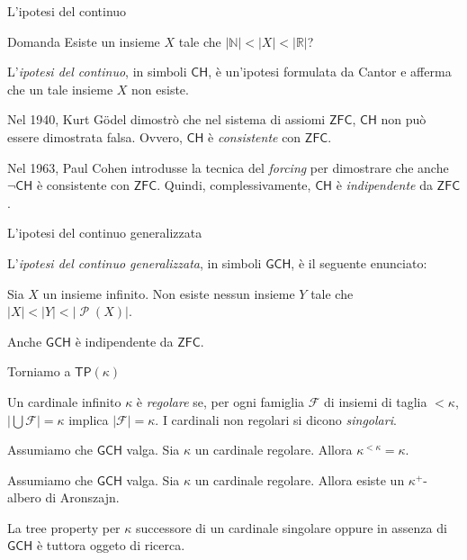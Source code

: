 \documentclass{beamer}
\theoremstyle{num.custom-title}
\theoremstyle{custom-title}
\DeclareMathOperator{\PP}{\mathcal{P}}
\newcommand{\ZFC}{\ensuremath{\mathsf{ZFC}}\xspace}
\newcommand{\TP}{\ensuremath{\mathsf{TP}}\xspace}
\newcommand{\GCH}{\ensuremath{\mathsf{GCH}}\xspace}
\newcommand{\CH}{\ensuremath{\mathsf{CH}}\xspace}
\newcommand{\F}{\mathcal{F}}
\newcommand{\N}{\mathbb{N}}
\newcommand{\R}{\mathbb{R}}
\begin{document}
\begin{frame}{L'ipotesi del continuo}

\begin{exampleblock}{Domanda}
Esiste un insieme $X$ tale che $|\N| < |X| < |\R|$?
\end{exampleblock}

\pause

L'\emph{ipotesi del continuo}, in simboli \CH, è un'ipotesi formulata da Cantor e afferma che un tale insieme $X$ non esiste.

\pause

Nel 1940, Kurt Gödel dimostrò che nel sistema di assiomi \ZFC, \CH non può essere dimostrata falsa. Ovvero, \CH è \emph{consistente} con \ZFC.

\pause

Nel 1963, Paul Cohen introdusse la tecnica del \emph{forcing} per dimostrare che anche $\neg\CH$ è consistente con \ZFC. Quindi, complessivamente, \CH è \emph{indipendente} da \ZFC.

\end{frame}


\begin{frame}{L'ipotesi del continuo generalizzata}

L'\emph{ipotesi del continuo generalizzata}, in simboli \GCH, è il seguente enunciato:
\begin{center}
Sia $X$ un insieme infinito. Non esiste nessun insieme $Y$ tale che $|X| < |Y| < |{\PP(X)}|$.
\end{center}

\pause

Anche \GCH è indipendente da \ZFC.

\end{frame}


\begin{frame}{Torniamo a $\TP(\kappa)$}

\vspace{10pt}

\begin{definition}
Un cardinale infinito $\kappa$ è \emph{regolare} se, per ogni famiglia $\F$ di insiemi di taglia $<\kappa$, $|\bigcup \F| = \kappa$ implica $|\F| = \kappa$. I cardinali non regolari si dicono \emph{singolari}.
\end{definition}

\pause

\begin{lemma}
Assumiamo che \GCH valga. Sia $\kappa$ un cardinale regolare. Allora $\kappa^{<\kappa} = \kappa$.
\end{lemma}

\pause

\begin{corollary}
Assumiamo che \GCH valga. Sia $\kappa$ un cardinale regolare. Allora esiste un $\kappa^+$-albero di Aronszajn.
\end{corollary}
La tree property per $\kappa$ successore di un cardinale singolare oppure in assenza di \GCH è tuttora oggeto di ricerca.

\end{frame}
\end{document}

